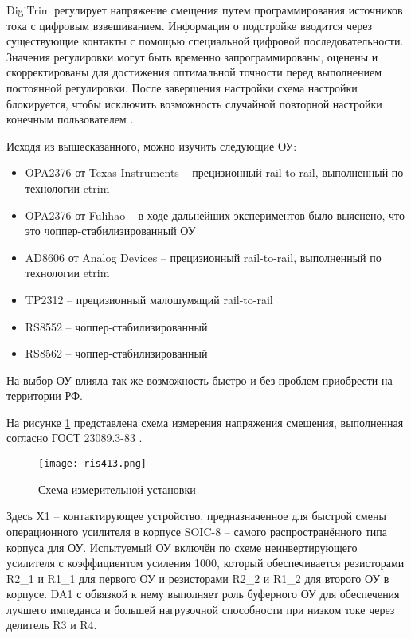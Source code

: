 DigiTrim регулирует напряжение смещения путем программирования источников тока с цифровым взвешиванием. 
Информация о подстройке вводится через существующие контакты с помощью специальной цифровой последовательности. 
Значения регулировки могут быть временно запрограммированы, оценены и скорректированы для достижения 
оптимальной точности перед выполнением постоянной регулировки. 
После завершения настройки схема настройки блокируется, чтобы исключить возможность случайной повторной 
настройки конечным пользователем \cite{MT-037:Tutorial}. 

Исходя из вышесказанного, можно изучить следующие ОУ:

\begin{itemize}
    \item OPA2376 от Texas Instruments -- прецизионный rail-to-rail, выполненный по технологии etrim
    \item OPA2376 от Fulihao -- в ходе дальнейших экспериментов было выяснено, что это 
    чоппер-стабилизированный ОУ
    \item AD8606 от Analog Devices -- прецизионный rail-to-rail, выполненный по технологии etrim
    \item TP2312 -- прецизионный малошумящий rail-to-rail
    \item RS8552 -- чоппер-стабилизированный
    \item RS8562 -- чоппер-стабилизированный
\end{itemize}

На выбор ОУ влияла так же возможность быстро и без проблем приобрести на территории РФ. 

На рисунке \ref{ris:413} представлена схема измерения напряжения смещения, выполненная согласно
ГОСТ 23089.3-83 \cite{Simple Op Amp Measurements} \cite{GOST 23089.3-83}.

\begin{figure}[H]
    \centering
    \texttt{[image: ris413.png]}
    \caption{Схема измерительной установки}
    \label{ris:413}
    \end{figure}

Здесь Х1 -- контактирующее устройство, предназначенное для быстрой смены операционного усилителя в 
корпусе SOIC-8 -- самого распространённого типа корпуса для ОУ. Испытуемый ОУ включён по схеме неинвертирующего 
усилителя с коэффициентом усиления 1000, который обеспечивается резисторами R2\_1 и R1\_1 для первого ОУ и
резисторами R2\_2 и R1\_2 для второго ОУ в корпусе. DA1 с обвязкой к нему выполняет роль буферного ОУ для 
обеспечения лучшего импеданса и большей нагрузочной способности при низком токе через делитель R3 и R4.


